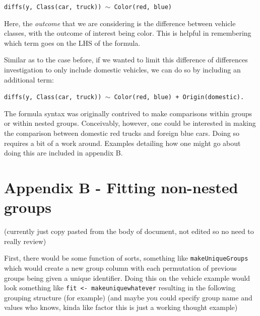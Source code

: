 \documentclass{article}
\newcommand{\xt}{\texttt}%
\begin{document}

\begin{center}
\tt diffs(y, Class(car, truck)) $\sim$ Color(red, blue)
\end{center}

Here, the \textit{outcome} that we are considering is the difference between vehicle classes, with the outcome of interest being color. This is helpful in remembering which term goes on the LHS of the formula. 

Similar as to the case before, if we wanted to limit this difference of differences investigation to only include domestic vehicles, we can do so by including an additional term:

\begin{center}
\tt diffs(y, Class(car, truck)) $\sim$ Color(red, blue) + Origin(domestic).
\end{center}

The formula syntax was originally contrived to make comparisons within groups or within nested groups. Conceivably, however, one could be interested in making the comparison between domestic red trucks and foreign blue cars. Doing so requires a bit of a work around. Examples detailing how one might go about doing this are included in appendix B. 

\section*{Appendix B - Fitting non-nested groups}

(currently just copy pasted from the body of document, not edited so no need to really review)

First, there would be some function of sorts, something like \xt{makeUniqueGroups} which would create a new group column with each permutation of previous groups being given a unique identifier. Doing this on the vehicle example would look something like \xt{fit <- makeuniquewhatever} resulting in the following grouping structure (for example) (and maybe you could specify group name and values who knows, kinda like factor this is just a working thought example)
\end{document}
